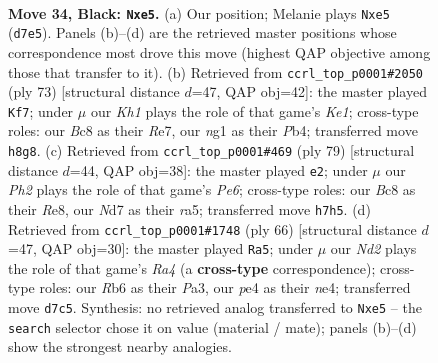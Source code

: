 \documentclass[11pt]{article}
\begin{document}
\clearpage

\begin{figure}[p]\centering
\begin{subfigure}{0.46\textwidth}\centering
\resizebox{\linewidth}{!}{%
\newchessgame
\chessboard[
  setfen={2b4k/3n1p1p/1r4p1/3PP3/1p2P3/6P1/1r5P/R4KNR b - - 2 34},
  showmover=false,
  pgfstyle=straightmove, color=movearrow, markmove={d7-e5}
]}
\caption{}
\end{subfigure}\hfill
\begin{subfigure}{0.46\textwidth}\centering
\resizebox{\linewidth}{!}{%
\newchessgame
\chessboard[
  setfen={4k3/p3r3/P3n3/2p3P1/1p3P1R/3r4/6P1/1NR3K1 b - - 2 37},
  showmover=false,
  pgfstyle=straightmove, color=movearrow, markmove={e8-f7}
]}
\caption{}
\end{subfigure}
\\[4pt]
\begin{subfigure}{0.46\textwidth}\centering
\resizebox{\linewidth}{!}{%
\newchessgame
\chessboard[
  setfen={4r1k1/5r1p/5p2/R2p1P2/1p1PnN2/4p1P1/P6P/2R4K b - - 1 40},
  showmover=false,
  pgfstyle=straightmove, color=movearrow, markmove={e3-e2}
]}
\caption{}
\end{subfigure}\hfill
\begin{subfigure}{0.46\textwidth}\centering
\resizebox{\linewidth}{!}{%
\newchessgame
\chessboard[
  setfen={2r5/p2r1p1p/2k1p3/8/R1Ppn1P1/PP5P/1K2N3/5R2 w - - 0 34},
  showmover=false,
  pgfstyle=straightmove, color=movearrow, markmove={a4-a5}
]}
\caption{}
\end{subfigure}
\caption{\textbf{Move 34, Black: \texttt{Nxe5}.} (a) Our position; Melanie plays \texttt{Nxe5} (\texttt{d7e5}). Panels (b)--(d) are the retrieved master positions whose correspondence most drove this move (highest QAP objective among those that transfer to it). (b) Retrieved from \texttt{ccrl\_top\_p0001\#2050} (ply 73) [structural distance $d$=47, QAP obj=42]: the master played \texttt{Kf7}; under $\mu$ our \emph{Kh1} plays the role of that game's \emph{Ke1}; cross-type roles: our \emph{B}c8 as their \emph{R}e7, our \emph{n}g1 as their \emph{P}b4; transferred move \texttt{h8g8}. (c) Retrieved from \texttt{ccrl\_top\_p0001\#469} (ply 79) [structural distance $d$=44, QAP obj=38]: the master played \texttt{e2}; under $\mu$ our \emph{Ph2} plays the role of that game's \emph{Pe6}; cross-type roles: our \emph{B}c8 as their \emph{R}e8, our \emph{N}d7 as their \emph{r}a5; transferred move \texttt{h7h5}. (d) Retrieved from \texttt{ccrl\_top\_p0001\#1748} (ply 66) [structural distance $d$=47, QAP obj=30]: the master played \texttt{Ra5}; under $\mu$ our \emph{Nd2} plays the role of that game's \emph{Ra4} (a \textbf{cross-type} correspondence); cross-type roles: our \emph{R}b6 as their \emph{P}a3, our \emph{p}e4 as their \emph{n}e4; transferred move \texttt{d7c5}. Synthesis: no retrieved analog transferred to \texttt{Nxe5} -- the \texttt{search} selector chose it on value (material / mate); panels (b)--(d) show the strongest nearby analogies.}
\label{fig:thought-m67}
\end{figure}
\end{document}
